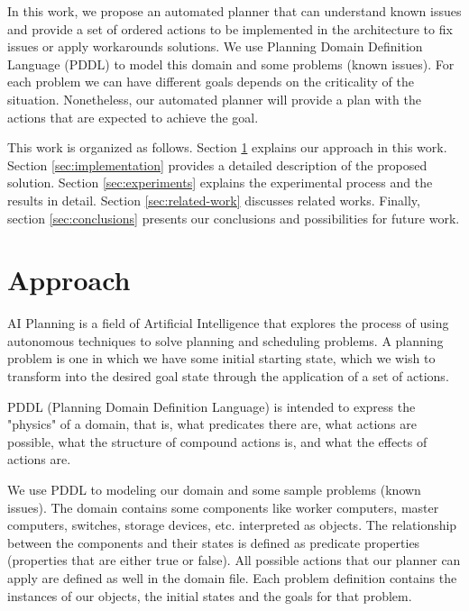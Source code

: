 \documentclass[letterpaper]{article}
\begin{document}
In this work, we propose an automated planner that can understand known issues and provide a set of ordered actions to be implemented in the architecture to fix issues or apply workarounds solutions. We use Planning Domain Definition Language (PDDL) to model this domain and some problems (known issues). For each problem we can have different goals depends on the criticality of the situation. Nonetheless, our automated planner will provide a plan with the actions that are expected to achieve the goal.

This work is organized as follows. Section \ref{sec:approach} explains our approach in this work. Section \ref{sec:implementation} provides a detailed description of the proposed solution. Section \ref{sec:experiments} explains the experimental process and the results in detail. Section \ref{sec:related-work} discusses related works. Finally, section \ref{sec:conclusions} presents our conclusions and possibilities for future work.

\section{Approach}\label{sec:approach}

AI Planning is a field of Artificial Intelligence that explores the process of using autonomous techniques to solve planning and scheduling problems. A planning problem is one in which we have some initial starting state, which we wish to transform into the desired goal state through the application of a set of actions.\cite{WhatisAI61:online}

PDDL (Planning Domain Definition Language) is intended to express the "physics" of a domain, that is, what predicates there are, what actions are possible, what the structure of compound actions is, and what the effects of actions are. \cite{ghallab1998pddl}

We use PDDL to modeling our domain and some sample problems (known issues). The domain contains some components like worker computers, master computers, switches, storage devices, etc. interpreted as objects. The relationship between the components and their states is defined as predicate properties (properties that are either true or false). All possible actions that our planner can apply are defined as well in the domain file. Each problem definition contains the instances of our objects, the initial states and the goals for that problem. 
\end{document}

